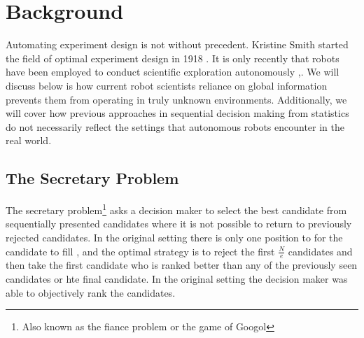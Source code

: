 \section{Background}
\label{sec:background}

Automating experiment design is not without precedent.  Kristine Smith started the field of optimal experiment design in 1918 \cite{smith1918standard}.
It is only recently that robots have been employed to conduct scientific exploration autonomously \cite{wagner2001science},\cite{king2004functional}.  We will discuss below is how current robot scientists reliance on global information prevents them from operating in truly unknown environments.  Additionally, we will cover how previous approaches in sequential decision making from statistics do not necessarily reflect the settings that autonomous robots encounter in the real world.


% 
% 
% 
% 
% 
% 

\subsection{The Secretary Problem}

The secretary problem\footnote{Also known as the fiance problem or the game of
Googol} asks a decision maker to select the best candidate from sequentially
presented candidates where it is not possible to return to previously rejected
candidates.  In the original setting there is only one position to for the
candidate to fill \cite{ferguson1989solved}, and the optimal strategy is to
reject the first $\frac{N}{e}$ candidates and then take the first candidate who
is ranked better than any of the previously seen candidates or hte final
candidate.  In the original setting the decision maker was able to objectively
rank the candidates.   


